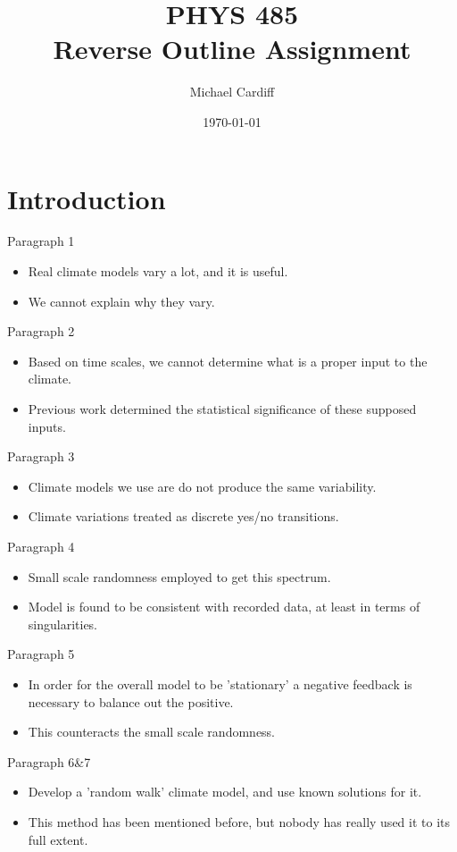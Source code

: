 \documentclass[12pt]{article}
\title{\vspace{-3em}PHYS 485\\Reverse Outline Assignment}
\author{Michael Cardiff}
\date{\today}
\begin{document}
\maketitle
\section{Introduction}

Paragraph 1
\begin{itemize}
\item Real climate models vary a lot, and it is useful.
\item We cannot explain why they vary.
\end{itemize}
Paragraph 2
\begin{itemize}
\item Based on time scales, we cannot determine what is a proper input to the climate.
\item Previous work determined the statistical significance of these supposed inputs.
\end{itemize}
Paragraph 3
\begin{itemize}
\item Climate models we use are do not produce the same variability.
\item Climate variations treated as discrete yes/no transitions.
\end{itemize}
Paragraph 4
\begin{itemize}
\item Small scale randomness employed to get this spectrum.
\item Model is found to be consistent with recorded data, at least in terms of singularities.
\end{itemize}
Paragraph 5
\begin{itemize}
\item In order for the overall model to be 'stationary' a negative feedback is necessary to balance out the positive.
\item This counteracts the small scale randomness.
\end{itemize}
Paragraph 6\&7
\begin{itemize}
\item Develop a 'random walk' climate model, and use known solutions for it.
\item This method has been mentioned before, but nobody has really used it to its full extent.
\end{itemize}
\end{document}
